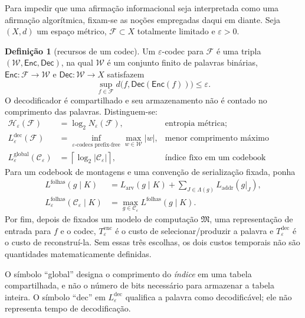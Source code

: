 \documentclass[12pt,a4paper]{article}
\theoremstyle{preciso}
\theoremstyle{definition}
\theoremstyle{preciso}
\theoremstyle{preciso}
\theoremstyle{preciso}
\theoremstyle{preciso}
\theoremstyle{definition}
\newtheorem{definition}[teorema]{Definição}
\theoremstyle{preciso}
\theoremstyle{definition}
\theoremstyle{preciso}
\theoremstyle{preciso}
\theoremstyle{definition}
\begin{document}
Para impedir que uma afirmação informacional seja interpretada como uma
afirmação algorítmica, fixam-se as noções empregadas daqui em diante. Seja
$(X,d)$ um espaço métrico, $\mathcal F\subset X$ totalmente limitado e
$\varepsilon>0$.

\begin{definition}[recursos de um codec]\label{map:artigo_2:3.19}\label{artigo_2:def:coding-resources}
Um $\varepsilon$-codec para $\mathcal F$ é uma tripla
$(\mathcal W,\mathsf{Enc},\mathsf{Dec})$, na qual $\mathcal W$ é um conjunto
finito de palavras binárias, $\mathsf{Enc}:\mathcal F\to\mathcal W$ e
$\mathsf{Dec}:\mathcal W\to X$ satisfazem
\[
 \sup_{f\in\mathcal F}d\bigl(f,\mathsf{Dec}(\mathsf{Enc}(f))\bigr)
 \le\varepsilon.
\]
O decodificador é compartilhado e seu armazenamento não é contado no
comprimento das palavras. Distinguem-se:
\begin{align*}
 \mathcal H_\varepsilon(\mathcal F)
  &=\log_2N_\varepsilon(\mathcal F),
  &&\text{entropia métrica;}\\
 L_\varepsilon^{\mathrm{dec}}(\mathcal F)
  &=\inf_{\text{$\varepsilon$-codecs prefix-free}}
    \max_{w\in\mathcal W}|w|,
  &&\text{menor comprimento máximo decodificável;}\\
 L_\varepsilon^{\mathrm{global}}(\mathcal C_\varepsilon)
  &=\left\lceil\log_2|\mathcal C_\varepsilon|\right\rceil,
  &&\text{índice fixo em um codebook compartilhado.}
\end{align*}
Para um codebook de montagens e uma convenção de serialização fixada, ponha
\begin{align*}
 L^{\mathrm{folhas}}(g\mid K)
   &=L_{\mathrm{arv}}(g\mid K)
     +\sum_{J\in\Lambda(g)}L_{\mathrm{addr}}(g|_J),\\
 L_\varepsilon^{\mathrm{folhas}}(\mathcal C_\varepsilon\mid K)
   &=\max_{g\in\mathcal C_\varepsilon}L^{\mathrm{folhas}}(g\mid K).
\end{align*}
Por fim, depois de fixados um modelo de computação $\mathfrak M$, uma
representação de entrada para $f$ e o codec, $T_\varepsilon^{\mathrm{enc}}$
é o custo de selecionar/produzir a palavra e $T_\varepsilon^{\mathrm{dec}}$ é
o custo de reconstruí-la. Sem essas três escolhas, os dois custos temporais
não são quantidades matematicamente definidas.
\end{definition}

O símbolo ``global'' designa o comprimento do \emph{índice} em uma tabela
compartilhada, e não o número de bits necessário para armazenar a tabela inteira.
O símbolo ``dec'' em $L_\varepsilon^{\mathrm{dec}}$ qualifica a palavra como
decodificável; ele não representa tempo de decodificação.
\end{document}
